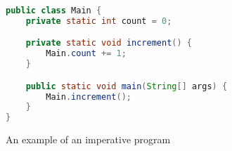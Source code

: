 \begin{figure}[htb]
    \centering
    \begin{lstlisting}[language=Java]
public class Main {
    private static int count = 0;

    private static void increment() {
        Main.count += 1;
    }

    public static void main(String[] args) {
        Main.increment();
    }
}\end{lstlisting}
    \caption{An example of an imperative program}
    \label{fig:imperative_example}
\end{figure}

